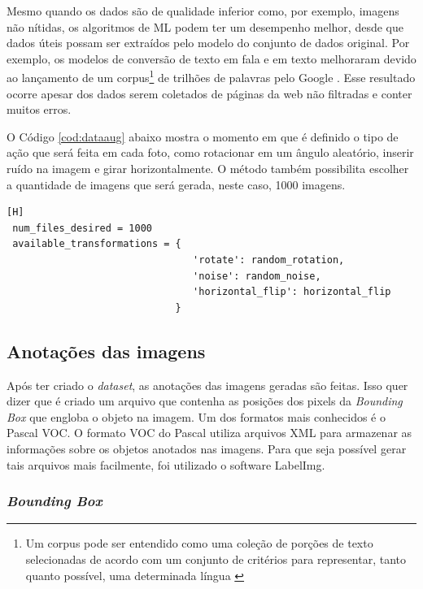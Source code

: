 Mesmo quando os dados são de qualidade inferior como, por exemplo, imagens não nítidas, os algoritmos de ML podem ter um desempenho melhor, desde que dados úteis possam ser extraídos pelo modelo do conjunto de dados original. Por exemplo, os modelos de conversão de texto em fala e em texto melhoraram devido ao lançamento de um corpus\footnote{Um corpus pode ser entendido como uma coleção de porções de texto selecionadas de acordo com um conjunto de critérios para representar, tanto quanto possível, uma determinada língua \cite{sinclair2005corpus}} de trilhões de palavras pelo Google \cite{halevy2009unreasonable}. Esse resultado ocorre apesar dos dados serem coletados de páginas da web não filtradas e conter muitos erros.\cite{dataAug}

O Código \ref{cod:dataaug} abaixo mostra o momento em que é definido o tipo de ação que será feita em cada foto, como rotacionar em um ângulo aleatório, inserir ruído na imagem e girar horizontalmente. O método também possibilita escolher a quantidade de imagens que será gerada, neste caso, 1000 imagens.

\begin{lstlisting}[caption=Exemplo de código do método \textit{data augmentation}, label=cod:dataaug][H]
 num_files_desired = 1000
 available_transformations = {
                                'rotate': random_rotation,
                                'noise': random_noise,
                                'horizontal_flip': horizontal_flip
                             }
\end{lstlisting}


\subsection{Anotações das imagens}

Após ter criado o \textit{dataset}, as anotações das imagens geradas são feitas. Isso quer dizer que é criado um arquivo que contenha as posições dos pixels da \textit{Bounding Box} que engloba o objeto na imagem. Um dos formatos mais conhecidos é o Pascal VOC. O formato VOC do Pascal utiliza arquivos XML para armazenar as informações sobre os objetos anotados nas imagens. Para que seja possível gerar tais arquivos mais facilmente, foi utilizado o software LabelImg.


\subsubsection*{\textit{Bounding Box}}

